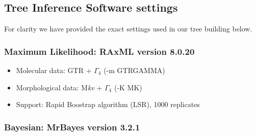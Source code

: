 \documentclass[12pt,letterpaper]{article}
\begin{document}



\newpage
\subsection{Tree Inference Software settings}

For clarity we have provided the exact settings used in our tree building below.

\subsubsection{Maximum Likelihood: RAxML version 8.0.20 \cite{Stamatakis21012014}}

\begin{itemize}
  \item Molecular data: GTR + $\Gamma_4$ (-m GTRGAMMA)
  \item Morphological data: M\textit{kv} + $\Gamma_4$ (-K MK)
  \item Support: Rapid Boostrap algorithm (LSR), 1000 replicates
\end{itemize}

\subsubsection{Bayesian: MrBayes version 3.2.1 \cite{Ronquist2012mrbayes}}
\end{document}

